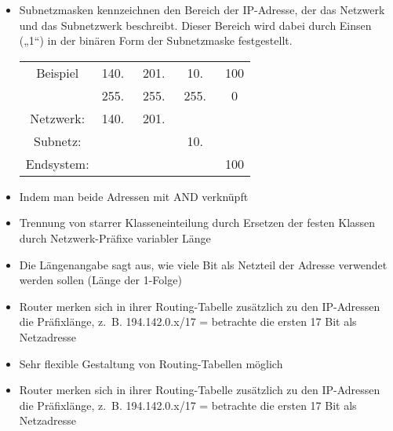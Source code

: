\begin{itemize}
    \item Subnetzmasken kennzeichnen den Bereich der IP-Adresse, der das Netzwerk und das Subnetzwerk beschreibt.
    Dieser Bereich wird dabei durch Einsen („1“) in der binären Form der Subnetzmaske festgestellt.
    \begin{center}
        \begin{tabular}{c|c c c c}
            Beispiel & 140.\ & 201.\ & 10.\  & 100 \tabularnewline
            & 255.\ & 255.\ & 255.\ & 0 \tabularnewline
            Netzwerk: & 140.\ & 201.\ & & \tabularnewline
            Subnetz: & & & 10.\ & \tabularnewline
            Endsystem: & & & & 100 \tabularnewline
        \end{tabular}
    \end{center}
\end{itemize}

\begin{itemize}
    \item Indem man beide Adressen mit AND verknüpft
\end{itemize}

\begin{itemize}
    \item Trennung von starrer Klasseneinteilung durch Ersetzen der festen Klassen durch Netzwerk-Präfixe variabler Länge
    \item Die Längenangabe sagt aus, wie viele Bit als Netzteil der Adresse verwendet werden sollen (Länge der 1-Folge)
    \item Router merken sich in ihrer Routing-Tabelle zusätzlich zu den IP-Adressen die Präfixlänge, z.\ B. 194.142.0.x/17 = betrachte die ersten 17 Bit als Netzadresse
    \item Sehr flexible Gestaltung von Routing-Tabellen möglich
\end{itemize}

\begin{itemize}
    \item Router merken sich in ihrer Routing-Tabelle zusätzlich zu den IP-Adressen die Präfixlänge, z.\ B. 194.142.0.x/17 = betrachte die ersten 17 Bit als Netzadresse
\end{itemize}

